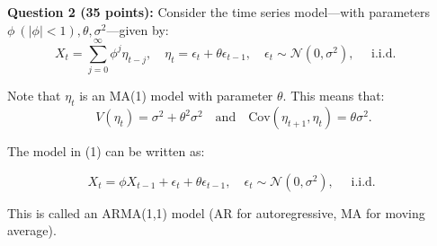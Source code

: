 \documentclass[12] {article}
\begin{document}
\noindent \textbf{Question 2 (35 points):} Consider the time series model---with parameters $\phi \: (|\phi|<1), \theta, \sigma^2$---given by:
\begin{equation}
X_t=  \sum_{j=0}^{\infty} \phi^j \eta_{t-j}, \quad \eta_t = \epsilon_{t} + \theta \epsilon_{t-1}, \quad \epsilon_t \sim \mathcal{N}(0,\sigma^2), \quad \textrm{ i.i.d. }\quad 
\end{equation}

\noindent Note that $\eta_t$ is an MA(1) model with parameter $\theta$. This means that:
\[ V(\eta_t) = \sigma^2 + \theta^2 \sigma^2 \quad \textrm{and} \quad \textrm{Cov}(\eta_{t+1}, \eta_t) = \theta \sigma^2.  \]

\noindent The model in (1) can be written as:

\begin{equation}
X_t =  \phi X_{t-1} + \epsilon_t + \theta \epsilon_{t-1}, \quad \epsilon_t \sim \mathcal{N}(0,\sigma^2), \quad \textrm{ i.i.d. }
\end{equation}

\noindent This is called an ARMA(1,1) model (AR for autoregressive, MA for moving average). 
\end{document}

